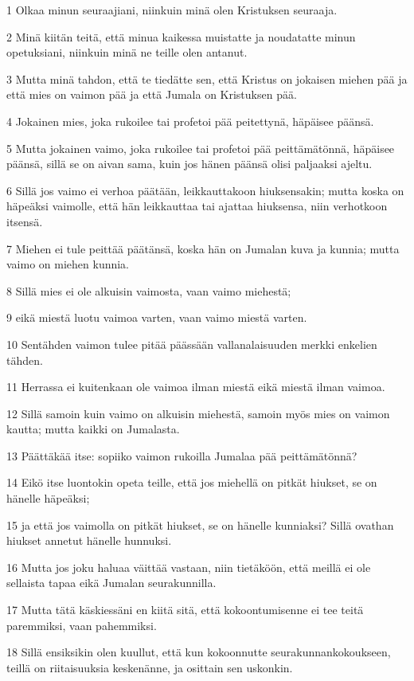 \par 1 Olkaa minun seuraajiani, niinkuin minä olen Kristuksen seuraaja.
\par 2 Minä kiitän teitä, että minua kaikessa muistatte ja noudatatte minun opetuksiani, niinkuin minä ne teille olen antanut.
\par 3 Mutta minä tahdon, että te tiedätte sen, että Kristus on jokaisen miehen pää ja että mies on vaimon pää ja että Jumala on Kristuksen pää.
\par 4 Jokainen mies, joka rukoilee tai profetoi pää peitettynä, häpäisee päänsä.
\par 5 Mutta jokainen vaimo, joka rukoilee tai profetoi pää peittämätönnä, häpäisee päänsä, sillä se on aivan sama, kuin jos hänen päänsä olisi paljaaksi ajeltu.
\par 6 Sillä jos vaimo ei verhoa päätään, leikkauttakoon hiuksensakin; mutta koska on häpeäksi vaimolle, että hän leikkauttaa tai ajattaa hiuksensa, niin verhotkoon itsensä.
\par 7 Miehen ei tule peittää päätänsä, koska hän on Jumalan kuva ja kunnia; mutta vaimo on miehen kunnia.
\par 8 Sillä mies ei ole alkuisin vaimosta, vaan vaimo miehestä;
\par 9 eikä miestä luotu vaimoa varten, vaan vaimo miestä varten.
\par 10 Sentähden vaimon tulee pitää päässään vallanalaisuuden merkki enkelien tähden.
\par 11 Herrassa ei kuitenkaan ole vaimoa ilman miestä eikä miestä ilman vaimoa.
\par 12 Sillä samoin kuin vaimo on alkuisin miehestä, samoin myös mies on vaimon kautta; mutta kaikki on Jumalasta.
\par 13 Päättäkää itse: sopiiko vaimon rukoilla Jumalaa pää peittämätönnä?
\par 14 Eikö itse luontokin opeta teille, että jos miehellä on pitkät hiukset, se on hänelle häpeäksi;
\par 15 ja että jos vaimolla on pitkät hiukset, se on hänelle kunniaksi? Sillä ovathan hiukset annetut hänelle hunnuksi.
\par 16 Mutta jos joku haluaa väittää vastaan, niin tietäköön, että meillä ei ole sellaista tapaa eikä Jumalan seurakunnilla.
\par 17 Mutta tätä käskiessäni en kiitä sitä, että kokoontumisenne ei tee teitä paremmiksi, vaan pahemmiksi.
\par 18 Sillä ensiksikin olen kuullut, että kun kokoonnutte seurakunnankokoukseen, teillä on riitaisuuksia keskenänne, ja osittain sen uskonkin.
